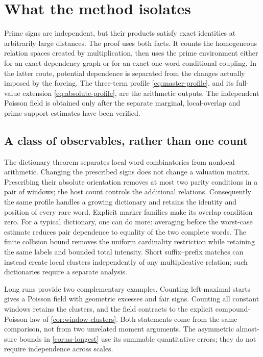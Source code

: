 \section{What the method isolates}\label{sec:discussion}
Prime signs are independent, but their products satisfy exact identities
at arbitrarily large distances. The proof uses both facts. It counts the
homogeneous relation spaces created by multiplication, then uses the
prime environment either for an exact dependency graph or for an exact
one-word conditional coupling. In the latter route, potential dependence
is separated from the changes actually imposed by the forcing. The
three-term profile \eqref{eq:master-profile}, and its full-value extension
\eqref{eq:absolute-profile}, are the arithmetic outputs. The independent
Poisson field is obtained only after the separate marginal, local-overlap
and prime-support estimates have been verified.

\subsection{A class of observables, rather than one count}
The dictionary theorem separates local word combinatorics from nonlocal
arithmetic. Changing the prescribed signs does not change a valuation
matrix. Prescribing their absolute orientation removes at most two parity
conditions in a pair of windows; the host count controls the additional
relations. Consequently the same profile handles a growing dictionary and
retains the identity and position of every rare word. Explicit marker families make its overlap condition zero. For a typical
dictionary, one can do more: averaging before the worst-case estimate
reduces pair dependence to equality of the two complete words. The
finite collision bound removes the uniform cardinality restriction while
retaining the same labels and bounded total intensity. Short suffix--prefix matches can instead create
local clusters independently of any multiplicative relation; such
dictionaries require a separate analysis.

Long runs provide two complementary examples. Counting left-maximal starts
gives a Poisson field with geometric excesses and fair signs. Counting all
constant windows retains the clusters, and the field contracts to the
explicit compound-Poisson law of \cref{cor:window-clusters}. Both statements
come from the same comparison, not from two unrelated moment arguments.
The asymmetric almost-sure bounds in \cref{cor:as-longest} use its summable
quantitative errors; they do not require independence across scales.

